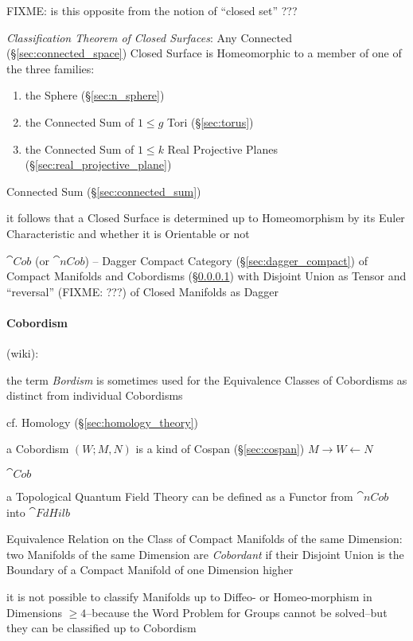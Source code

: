 FIXME: is this opposite from the notion of ``closed set'' ???

\emph{Classification Theorem of Closed Surfaces}: Any Connected
(\S\ref{sec:connected_space}) Closed Surface is Homeomorphic to a member of one
of the three families:
\begin{enumerate}
  \item the Sphere (\S\ref{sec:n_sphere})
  \item the Connected Sum of $1 \leq g$ Tori (\S\ref{sec:torus})
  \item the Connected Sum of $1 \leq k$ Real Projective Planes
    (\S\ref{sec:real_projective_plane})
\end{enumerate}
\fist Connected Sum (\S\ref{sec:connected_sum})

it follows that a Closed Surface is determined up to Homeomorphism by its Euler
Characteristic and whether it is Orientable or not

$\cat{Cob}$ (or $\cat{nCob}$) -- Dagger Compact Category
(\S\ref{sec:dagger_compact}) of Compact Manifolds and Cobordisms
(\S\ref{sec:cobordism}) with Disjoint Union as Tensor and ``reversal'' (FIXME:
???) of Closed Manifolds as Dagger



\paragraph{Cobordism}\label{sec:cobordism}\hfill

(wiki):

the term \emph{Bordism} is sometimes used for the Equivalence Classes of
Cobordisms as distinct from individual Cobordisms

cf. Homology (\S\ref{sec:homology_theory})

a Cobordism $(W; M, N)$ is a kind of Cospan (\S\ref{sec:cospan})
$M \rightarrow W \leftarrow N$

$\cat{Cob}$

a Topological Quantum Field Theory can be defined as a Functor from $\cat{nCob}$
into $\cat{FdHilb}$

Equivalence Relation on the Class of Compact Manifolds of the same Dimension:
two Manifolds of the same Dimension are \emph{Cobordant} if their Disjoint
Union is the Boundary of a Compact Manifold of one Dimension higher

it is not possible to classify Manifolds up to Diffeo- or Homeo-morphism in
Dimensions $\geq 4$--because the Word Problem for Groups cannot be solved--but
they can be classified up to Cobordism

